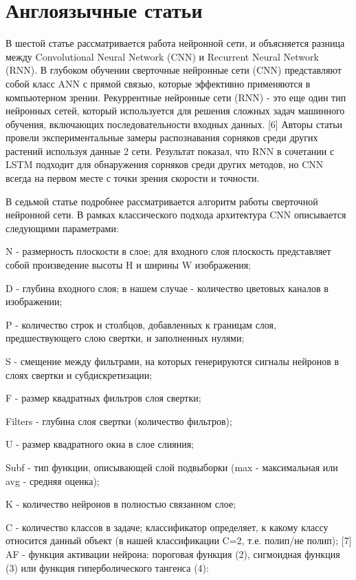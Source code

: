 \documentclass{svproc}
\begin{document}
\section{Англоязычные статьи}
%
В шестой статье рассматривается работа нейронной сети, и объясняется разница между Convolutional Neural Network (CNN) и Recurrent Neural Network (RNN). В глубоком обучении сверточные нейронные сети (CNN) представляют собой класс ANN с прямой связью, которые эффективно применяются в компьютерном зрении. Рекуррентные нейронные сети (RNN) - это еще один тип нейронных сетей, который используется для решения сложных задач машинного обучения, включающих последовательности входных данных. [6] Авторы статьи провели экспериментальные замеры распознавания сорняков среди других растений используя данные 2 сети. Результат показал, что RNN в сочетании с LSTM подходит для обнаружения сорняков среди других методов, но CNN всегда на первом месте с точки зрения скорости и точности. 

В седьмой статье подробнее рассматривается алгоритм работы сверточной нейронной сети. В рамках классического подхода архитектура CNN описывается следующими параметрами: 

N - размерность плоскости в слое; для входного слоя плоскость представляет собой произведение высоты H и ширины W изображения;

D - глубина входного слоя; в нашем случае - количество цветовых каналов в изображении; 

P - количество строк и столбцов, добавленных к границам слоя, предшествующего слою свертки, и заполненных нулями; 

S - смещение между фильтрами, на которых генерируются сигналы нейронов в слоях свертки и субдискретизации; 

F - размер квадратных фильтров слоя свертки; 

Filters - глубина слоя свертки (количество фильтров); 

U - размер квадратного окна в слое слияния; 

Subf - тип функции, описывающей слой подвыборки (max - максимальная или avg - средняя оценка); 

K - количество нейронов в полностью связанном слое; 

C - количество классов в задаче; классификатор определяет, к какому классу относится данный объект (в нашей классификации C=2, т.е. полип/не полип); [7]
AF - функция активации нейрона: пороговая функция (2), сигмоидная функция (3) или функция гиперболического тангенса (4):
\end{document}

